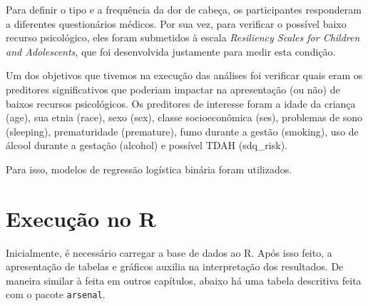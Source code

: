 \documentclass[
]{book}
\newenvironment{Shaded}{\begin{snugshade}}{\end{snugshade}}
\newcommand{\DataTypeTok}[1]{\textcolor[rgb]{0.13,0.29,0.53}{#1}}
\newcommand{\KeywordTok}[1]{\textcolor[rgb]{0.13,0.29,0.53}{\textbf{#1}}}
\newcommand{\NormalTok}[1]{#1}
\newcommand{\OperatorTok}[1]{\textcolor[rgb]{0.81,0.36,0.00}{\textbf{#1}}}
\newcommand{\OtherTok}[1]{\textcolor[rgb]{0.56,0.35,0.01}{#1}}
\newcommand{\StringTok}[1]{\textcolor[rgb]{0.31,0.60,0.02}{#1}}
\begin{document}
Para definir o tipo e a frequência da dor de cabeça, os participantes responderam a diferentes questionários médicos. Por sua vez, para verificar o possível baixo recurso psicológico, eles foram submetidos à escala \emph{Resiliency Scales for Children and Adolescents}, que foi desenvolvida justamente para medir esta condição.

Um dos objetivos que tivemos na execução das análises foi verificar quais eram os preditores significativos que poderiam impactar na apresentação (ou não) de baixos recursos psicológicos. Os preditores de interesse foram a idade da criança (age), sua etnia (race), sexo (sex), classe socioeconômica (ses), problemas de sono (sleeping), prematuridade (premature), fumo durante a gestão (smoking), uso de álcool durante a gestação (alcohol) e possível TDAH (sdq\_risk).

Para isso, modelos de regressão logística binária foram utilizados.

\hypertarget{execuuxe7uxe3o-no-r-16}{%
\section{Execução no R}\label{execuuxe7uxe3o-no-r-16}}

Inicialmente, é necessário carregar a base de dados ao R. Após isso feito, a apresentação de tabelas e gráficos auxilia na interpretação dos resultados. De maneira similar à feita em outros capítulos, abaixo há uma tabela descritiva feita com o pacote \texttt{arsenal}.

\begin{Shaded}
\end{Shaded}
\end{document}
